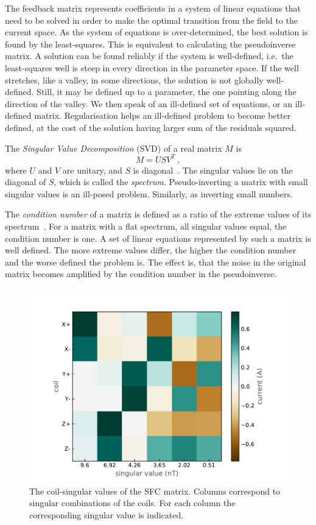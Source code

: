 The feedback matrix represents coefficients in a system of linear equations that need to be solved in order to make the optimal transition from the field to the current space. As the system of equations is over-determined, the best solution is found by the least-squares. This is equivalent to calculating the pseudoinverse matrix. A solution can be found reliably if the system is well-defined, i.e.\ the least-squares well is steep in every direction in the parameter space. If the well stretches, like a valley, in some directions, the solution is not globally well-defined. Still, it may be defined up to a parameter, the one pointing along the direction of the valley. We then speak of an ill-defined set of equations, or an ill-defined matrix. Regularisation helps an ill-defined problem to become better defined, at the cost of the solution having larger sum of the residuals squared.

The \emph{Singular Value Decomposition} (SVD) of a real matrix $M$ is
\begin{equation}
  M = U S V^T \ , 
\end{equation}
where $U$ and $V$ are unitary, and $S$ is diagonal~\cite{Golub1965}. The singular values lie on the diagonal of $S$, which is called the \emph{spectrum}. 
Pseudo-inverting a matrix with small singular values is an ill-posed problem. Similarly, as inverting small numbers.

The \emph{condition number} of a matrix is defined as a ratio of the extreme values of its spectrum~\cite{Regression}. For a matrix with a flat spectrum, all singular values equal, the condition number is one. A set of linear equations represented by such a matrix is well defined. The more extreme values differ, the higher the condition number and the worse defined the problem is. The effect is, that the noise in the original matrix becomes amplified by the condition number in the pseudoinverse.

\begin{figure}
  \centering
  \includegraphics[width=.8\linewidth]{gfx/nEDM_SFC/coil-singular_vectors_of_the_nEDM_SFC_matrix.pdf}
  \caption{The coil-singular values of the SFC matrix. Columns correspond to singular combinations of the coils. For each column the corresponding singular value is indicated.}\label{fig:nEDM_SFC_svd}
\end{figure}

